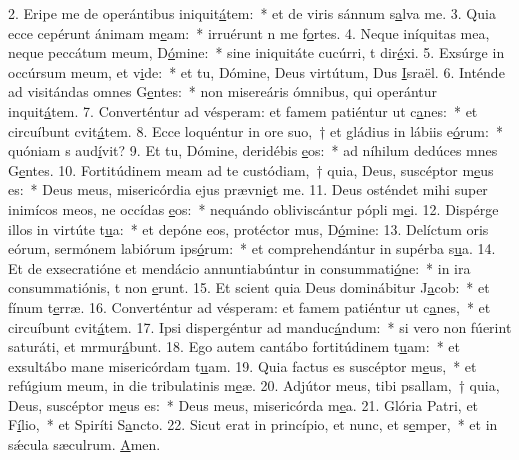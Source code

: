 2. Eripe me de operántibus iniquit\uline{á}tem:~* et de viris sánnum s\uline{a}lva me.
3. Quia ecce cepérunt ánimam m\uline{e}am:~* irruérunt n me f\uline{o}rtes.
4. Neque iníquitas mea, neque peccátum meum, D\uline{ó}mine:~* sine iniquitáte cucúrri, t dir\uline{é}xi.
5. Exsúrge in occúrsum meum, et v\uline{i}de:~* et tu, Dómine, Deus virtútum, Dus \uline{I}sraël.
6. Inténde ad visitándas omnes G\uline{e}ntes:~* non misereáris ómnibus, qui operántur inquit\uline{á}tem.
7. Converténtur ad vésperam: et famem patiéntur ut c\uline{a}nes:~* et circuíbunt cvit\uline{á}tem.
8. Ecce loquéntur in ore suo,~† et gládius in lábiis e\uline{ó}rum:~* quóniam s aud\uline{í}vit?
9. Et tu, Dómine, deridébis \uline{e}os:~* ad níhilum dedúces mnes G\uline{e}ntes.
10. Fortitúdinem meam ad te custódiam,~† quia, Deus, suscéptor m\uline{e}us es:~* Deus meus, misericórdia ejus prævni\uline{e}t me.
11. Deus osténdet mihi super inimícos meos, ne occídas \uline{e}os:~* nequándo obliviscántur pópli m\uline{e}i.
12. Dispérge illos in virtúte t\uline{u}a:~* et depóne eos, protéctor mus, D\uline{ó}mine:
13. Delíctum oris eórum, sermónem labiórum ips\uline{ó}rum:~* et comprehendántur in supérba s\uline{u}a.
14. Et de exsecratióne et mendácio annuntiabúntur in consummati\uline{ó}ne:~* in ira consummatiónis, t non \uline{e}runt.
15. Et scient quia Deus dominábitur J\uline{a}cob:~* et fínum t\uline{e}rræ.
16. Converténtur ad vésperam: et famem patiéntur ut c\uline{a}nes,~* et circuíbunt cvit\uline{á}tem.
17. Ipsi dispergéntur ad manduc\uline{á}ndum:~* si vero non fúerint saturáti, et mrmur\uline{á}bunt.
18. Ego autem cantábo fortitúdinem t\uline{u}am:~* et exsultábo mane misericórdam t\uline{u}am.
19. Quia factus es suscéptor m\uline{e}us,~* et refúgium meum, in die tribulatinis m\uline{e}æ.
20. Adjútor meus, tibi psallam,~† quia, Deus, suscéptor m\uline{e}us es:~* Deus meus, misericórda m\uline{e}a.
21. Glória Patri, et F\uline{í}lio,~* et Spiríti S\uline{a}ncto.
22. Sicut erat in princípio, et nunc, et s\uline{e}mper,~* et in sǽcula sæculrum. \uline{A}men.
